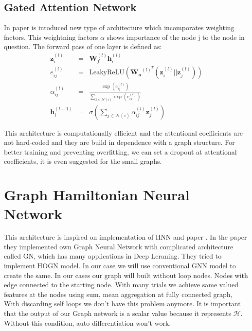 \subsection{Gated Attention Network}
In paper \cite{gat} is intoduced new type of architecture which incomporates weighting factors. This weightning factors $\alpha$ shows importance of the node j to the node in question.
The forward pass of one layer is defined as:
\begin{eqnarray}
\mathbf{z}_i^{(l)}&=&\mathbf{W}_f^{(l)}\mathbf{h}_i^{(l)} \\
e_{ij}^{(l)}&=&\text{LeakyReLU}(\mathbf{W_a}^{(l)^T}(\mathbf{z}_i^{(l)}||\mathbf{z}_j^{(l)}))\\
\alpha_{ij}^{(l)}&=&\frac{\exp(e_{ij}^{(l)})}{\sum_{k\in \mathcal{N}(i)}^{}\exp(e_{ik}^{(l)})}\\
\mathbf{h}_i^{(l+1)}&=&\sigma\left(\sum_{j\in \mathcal{N}(i)} {\alpha^{(l)}_{ij} \mathbf{z}^{(l)}_j }\right)
\end{eqnarray}

This architecture is computationally efficient and the attentional coefficients are not hard-coded and they are build in dependence with a graph structure.
For better training and preventing overfitting, we can set a dropout at attentional coefficients\cite{att}, it is even suggested for  the small graphs.












\section{Graph Hamiltonian Neural Network}
This architecture is inspired on implementation of HNN\cite{hnn} and paper \cite{GNNODE}. In the paper they implemented own Graph Neural Network with complicated architecture called GN, which has many applications in Deep Leraning.  They tried to implement HOGN model.
In our case we will use conventional GNN model to create the same.
In our cases our graph will built without loop nodes. Nodes with edge connected to the starting node. With many trials we achieve same valued features at the nodes using sum, mean aggregation at fully connected graph, With discarding self loops we don't have this problem anymore.  It is important that the output of our Graph network is a scalar value because it represents $\mathcal{H}$. Without this condition, auto differentiation won't work. 

